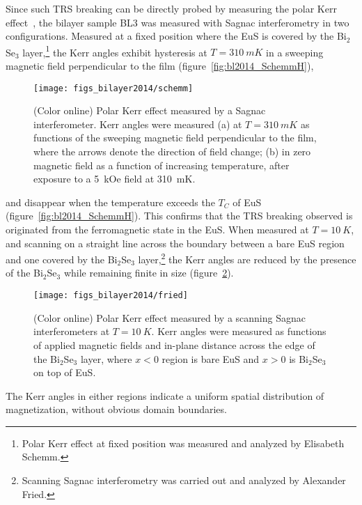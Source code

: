 Since such TRS breaking can be directly probed by measuring the polar Kerr effect~\cite{Xia2006}, the bilayer sample BL3 was measured with Sagnac interferometry in two configurations. Measured at a fixed position where the EuS is covered by the Bi$_2$Se$_3$ layer,\footnote{Polar Kerr effect at fixed position was measured and analyzed by Elisabeth Schemm.} the Kerr angles exhibit hysteresis at $T=\SI{310}{mK}$ in a sweeping magnetic field perpendicular to the film (figure~\ref{fig:bl2014_SchemmH}),%
%
\begin{figure}[ht]%
\centering%
\subfloat{\label{fig:bl2014_SchemmT}}%
\subfloat{\label{fig:bl2014_SchemmH}}%
\texttt{[image: figs\_bilayer2014/schemm]}
\caption[Polar Kerr effect in Bi$_2$Se$_3$--EuS bilayers]{\label{fig:bl2014_schemm}(Color online) Polar Kerr effect measured by a Sagnac interferometer. Kerr angles were measured (a) at $T=\SI{310}{mK}$ as functions of the sweeping magnetic field perpendicular to the film, where the arrows denote the direction of field change; (b) in zero magnetic field as a function of increasing temperature, after exposure to a 5~kOe field at \SI{310}{mK}.}%
\end{figure} %
%
and disappear when the temperature exceeds the $T_C$ of EuS (figure~\ref{fig:bl2014_SchemmH}). This confirms that the TRS breaking observed is originated from the ferromagnetic state in the EuS. When measured at $T=\SI{10}{K}$, and scanning on a straight line across the boundary between a bare EuS region and one covered by the Bi$_2$Se$_3$ layer,\footnote{Scanning Sagnac interferometry was carried out and analyzed by Alexander Fried.} the Kerr angles are reduced by the presence of the Bi$_2$Se$_3$ while remaining finite in size (figure~\ref{fig:bl2014_Fried}).%
%
\begin{figure}[ht]%
\centering%
\texttt{[image: figs\_bilayer2014/fried]}
\caption[Scanning polar Kerr effect measurements on a Bi$_2$Se$_3$--EuS bilayer]{\label{fig:bl2014_Fried}(Color online) Polar Kerr effect measured by a scanning Sagnac interferometers at $T=\SI{10}{K}$. Kerr angles were measured as functions of applied magnetic fields and in-plane distance across the edge of the Bi$_2$Se$_3$ layer, where $x<0$ region is bare EuS and $x>0$ is Bi$_2$Se$_3$ on top of EuS.}%
\end{figure} %
The Kerr angles in either regions indicate a uniform spatial distribution of magnetization, without obvious domain boundaries.

\FloatBarrier%
